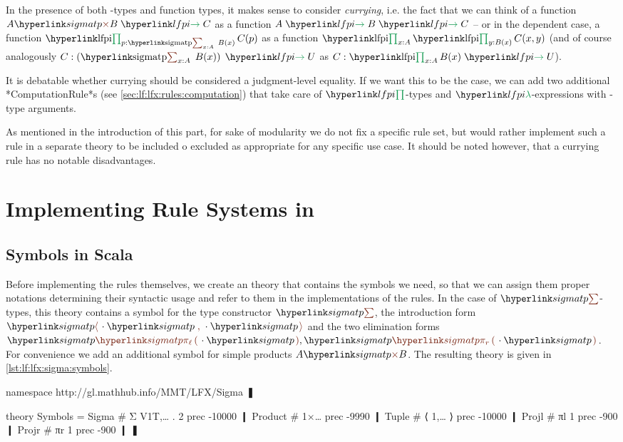 \begin{remark}[Currying]
	In the presence of both \sigmasym-types and function types, it makes sense to consider \emph{currying}, i.e. the fact that we can think of a function $\lfarrow{\simpleprod AB}C$ as a function $\lfarrow A{\lfarrow BC}$ -- or in the dependent case, a function $\lfpi{p: \sigmatp{x:A}B(x)}{C(p)}$ as a function $\lfpi{x:A}{\lfpi{y:B(x)}{C(x,y)}}$ (and of course analogously $\lfarrow{C:\left(\sigmatp{x:A}{B(x)}\right)}U$ as $C:\lfpi{x:A}{\lfarrow{B(x)}U}$).
	
	It is debatable whether currying should be considered a judgment-level equality. If we want this to be the case, we can add two additional *ComputationRule*s (see \autoref{sec:lf:lfx:rules:computation}) that take care of $\lfpisym$-types and $\lflambdasym$-expressions with \sigmasym-type arguments.
	
	As mentioned in the introduction of this part, for sake of modularity we do not fix a specific rule set, but would rather implement such a rule in a separate theory to be included o excluded as appropriate for any specific use case. It should be noted however, that a currying rule has no notable disadvantages.
\end{remark}

\section{Implementing Rule Systems in \mmt}

\subsection{\mmt Symbols in Scala}\label{sec:lf:lfx:sigma:symbolrefs}

Before implementing the rules themselves, we create an \mmt theory that contains the symbols we need, so that we can assign them proper notations determining their syntactic usage and refer to them in the implementations of the rules. In the case of $\sigmasym$-types, this theory contains a symbol for the type constructor $\sigmasym$, the introduction form $\pair\cdot\cdot$ and the two elimination forms $\projl\cdot,\projr\cdot$. For convenience we add an additional symbol for simple products $\simpleprod AB$. The resulting theory is given in \autoref{lst:lf:lfx:sigma:symbols}.
\begin{mmtcode}[caption={The \cn{Symbols} Theory\protect\footnotemark},label=lst:lf:lfx:sigma:symbols]
namespace http://gl.mathhub.info/MMT/LFX/Sigma ❚

theory Symbols =
   Sigma	# Σ V1T,… . 2		prec -10000	❙
   Product	# 1×…			prec  -9990	❙
   Tuple	# ⟨ 1,… ⟩		prec -10000	❙
   Projl	# πl 1			prec -900	❙
   Projr	# πr 1			prec -900	❙
❚
\end{mmtcode}

